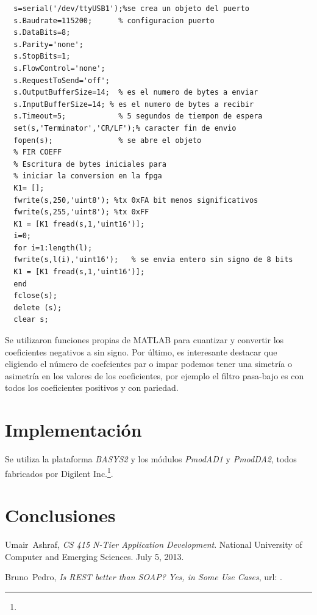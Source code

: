 \documentclass[conference]{IEEEtran}
\begin{document}
\begin{lstlisting}[frame=single]
  % Trasmision serie
  s=serial('/dev/ttyUSB1');%se crea un objeto del puerto
  s.Baudrate=115200;      % configuracion puerto
  s.DataBits=8;
  s.Parity='none';
  s.StopBits=1;
  s.FlowControl='none';
  s.RequestToSend='off';
  s.OutputBufferSize=14;  % es el numero de bytes a enviar
  s.InputBufferSize=14; % es el numero de bytes a recibir
  s.Timeout=5;            % 5 segundos de tiempon de espera
  set(s,'Terminator','CR/LF');% caracter fin de envio  
  fopen(s);               % se abre el objeto  
  % FIR COEFF
  % Escritura de bytes iniciales para
  % iniciar la conversion en la fpga
  K1= [];  
  fwrite(s,250,'uint8'); %tx 0xFA bit menos significativos  
  fwrite(s,255,'uint8'); %tx 0xFF  
  K1 = [K1 fread(s,1,'uint16')];  
  i=0;
  for i=1:length(l);
  fwrite(s,l(i),'uint16');   % se envia entero sin signo de 8 bits
  K1 = [K1 fread(s,1,'uint16')];
  end  
  fclose(s); 
  delete (s);
  clear s;
\end{lstlisting}


Se utilizaron  funciones propias de MATLAB
para cuantizar y convertir los coeficientes negativos a sin
signo. Por último, es interesante destacar que eligiendo el número de
coefcientes par o impar podemos tener una simetría o asimetría en los
valores de los coeficientes, por ejemplo el filtro pasa-bajo es con
todos los coeficientes positivos y con pariedad.

\section{Implementación}
\label{sec:imp}

Se utiliza la plataforma \emph{BASYS2} y los módulos \emph{PmodAD1} y
\emph{PmodDA2}, todos fabricados por Digilent
Inc.\footnote{}. 

\section{Conclusiones}
\label{sec:con}
\lipsum[87]

\begin{thebibliography}{1}

  Umair~Ashraf, \emph{CS 415 N-Tier Application Development}. National
  University of Computer and Emerging Sciences. July 5, 2013.

Bruno~Pedro, \emph{Is REST better than SOAP? Yes, in Some Use Cases},
url:
\texttt{}.

\end{thebibliography}

\end{document}
